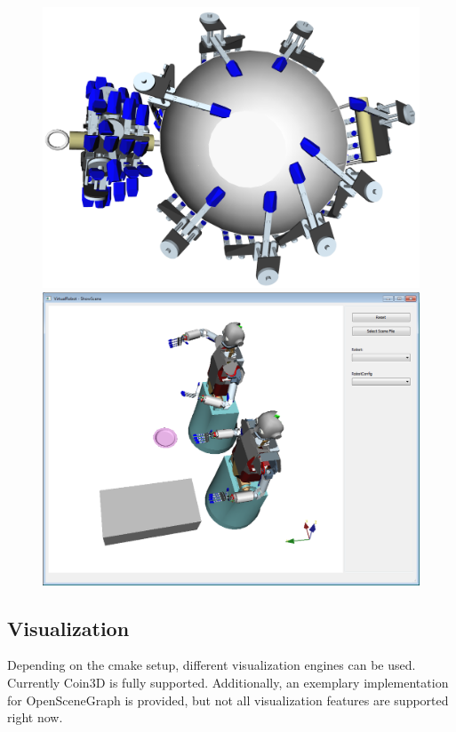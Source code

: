 \begin{figure}[H]
	\centering
	\begin{minipage} {.45\linewidth}
	  \includegraphics[width=\linewidth]{Wok_grasps_EEF}
	\end{minipage}
	\begin{minipage} {.45\linewidth}
	  \includegraphics[width=\linewidth]{Tutorial10}
	\end{minipage}	
\end{figure}
\subsection{Visualization}
Depending on the cmake setup, different visualization engines can be used. Currently Coin3D is fully supported. Additionally, an exemplary implementation for OpenSceneGraph is provided, but not all visualization features are supported right now.
